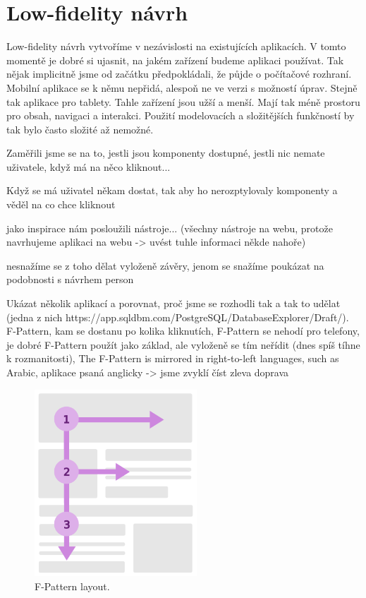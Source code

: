 \section{Low-fidelity návrh}

Low-fidelity návrh vytvoříme v nezávislosti na existujících aplikacích. V tomto momentě je dobré si ujasnit, na jakém zařízení budeme aplikaci používat. Tak nějak implicitně jsme od začátku předpokládali, že půjde o počítačové rozhraní. Mobilní aplikace se k němu nepřidá, alespoň ne ve verzi s možností úprav. Stejně tak aplikace pro tablety. Tahle zařízení jsou užší a menší. Mají tak méně prostoru pro obsah, navigaci a interakci. Použití modelovacích a složitějších funkčností by tak bylo často složité až nemožné.

Zaměřili jsme se na to, jestli jsou komponenty dostupné, jestli nic nemate uživatele, když má na něco kliknout...

Když se má uživatel někam dostat, tak aby ho nerozptylovaly komponenty a věděl na co chce kliknout

jako inspirace nám posloužili nástroje... (všechny nástroje na webu, protože navrhujeme aplikaci na webu -> uvést tuhle informaci někde nahoře)

nesnažíme se z toho dělat vyloženě závěry, jenom se snažíme poukázat na podobnosti s návrhem person

Ukázat několik aplikací a porovnat, proč jsme se rozhodli tak a tak to udělat (jedna z nich https://app.sqldbm.com/PostgreSQL/DatabaseExplorer/Draft/). F-Pattern, kam se dostanu po kolika kliknutích, F-Pattern se nehodí pro telefony, je dobré F-Pattern použít jako základ, ale vyloženě se tím neřídit (dnes spíš tíhne k rozmanitosti), The F-Pattern is mirrored in right-to-left languages, such as Arabic, aplikace psaná anglicky -> jsme zvyklí číst zleva doprava

\begin{figure}[htb]
    \centering
    \includegraphics[height=70mm]{../img/F-Pattern}
    \caption{F-Pattern layout.}
    \label{obr03:fpattern}
  \end{figure}


